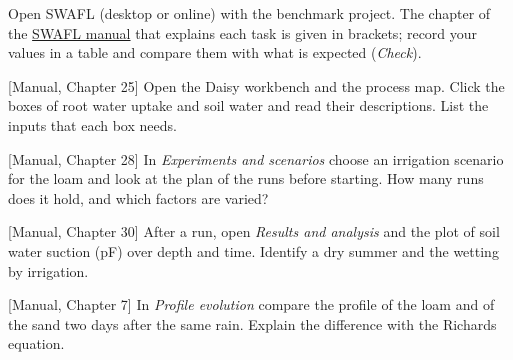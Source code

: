 {\small Open SWAFL (desktop or online) with the benchmark project. The chapter of the \href{https://github.com/halilunaziru73-creator/Coupled-Water-Fluxes-Pore-Scale-Dynamics-Precision-Irrigation-Mulching-Feedback-Loops/raw/main/Software/v1.1.0/SWAFL_Desktop/docs/manual_v1.1.0/SWAFL_Manual_v1.1.0.pdf}{SWAFL manual} that explains each task is given in brackets; record your values in a table and compare them with what is expected (\emph{Check}).}\par\vspace{3pt}
\begin{exlist}
\item {\color{khblue}[Manual, Chapter 25]} Open the Daisy workbench and the process map. Click the boxes of root water uptake and soil water and read their descriptions. List the inputs that each box needs.\par{}
\item {\color{khblue}[Manual, Chapter 28]} In \emph{Experiments and scenarios} choose an irrigation scenario for the loam and look at the plan of the runs before starting. How many runs does it hold, and which factors are varied?\par{}
\item {\color{khblue}[Manual, Chapter 30]} After a run, open \emph{Results and analysis} and the plot of soil water suction (pF) over depth and time. Identify a dry summer and the wetting by irrigation.\par{}
\item {\color{khblue}[Manual, Chapter 7]} In \emph{Profile evolution} compare the profile of the loam and of the sand two days after the same rain. Explain the difference with the Richards equation.\par{}
\end{exlist}
